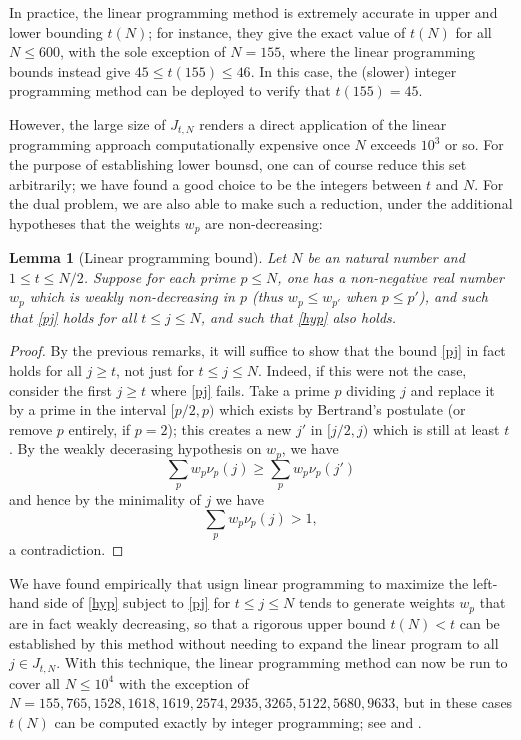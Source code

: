 \documentclass[12pt,a4paper,reqno]{amsart}
\numberwithin{equation}{section}
\theoremstyle{plain}
\newtheorem{lemma}[theorem]{Lemma}
\theoremstyle{definition}
\begin{document}
In practice, the linear programming method is extremely accurate in upper and lower bounding $t(N)$; for instance, they give the exact value of $t(N)$ for all $N \leq 600$, with the sole exception of $N=155$, where the linear programming bounds instead give $45 \leq t(155) \leq 46$.  In this case, the (slower) integer programming method can be deployed to verify that $t(155)=45$.


However, the large size of $J_{t,N}$ renders a direct application of the linear programming approach computationally expensive once $N$ exceeds $10^3$ or so.  For the purpose of establishing lower bounsd, one can of course reduce this set arbitrarily; we have found a good choice to be the integers between $t$ and $N$.  For the dual problem, we are also able to make such a reduction, under the additional hypotheses that the weights $w_p$ are non-decreasing:
  
\begin{lemma}[Linear programming bound]\label{lp-upper}  Let $N$ be an natural number and $1 \leq t \leq N/2$.  Suppose for each prime $p \leq N$, one has a non-negative real number $w_p$ which is weakly non-decreasing in $p$ (thus $w_p \leq w_{p'}$ when $p \leq p'$), and such that \eqref{pj} holds
  for all $t \leq j \leq N$, and such that \eqref{hyp} also holds.
\end{lemma}
  
\begin{proof}
By the previous remarks, it will suffice to show that the bound \eqref{pj} in fact holds for all $j \geq t$, not just for $t \leq j \leq N$.  Indeed, if this were not the case, consider the first $j \geq t$ where \eqref{pj} fails.  Take a prime $p$ dividing $j$ and replace it by a prime in the interval $[p/2,p)$ which exists by Bertrand's postulate (or remove $p$ entirely, if $p=2$); this creates a new $j'$ in $[j/2,j)$ which is still at least $t$.  By the weakly decerasing hypothesis on $w_p$, we have
  $$ \sum_p w_p \nu_p(j) \geq \sum_p w_p \nu_p(j')$$
  and hence by the minimality of $j$ we have
  $$ \sum_p w_p \nu_p(j) > 1, $$
  a contradiction.
\end{proof}
  
We have found empirically that usign linear programming to maximize the left-hand side of \eqref{hyp} subject to \eqref{pj} for $t \leq j \leq N$ tends to generate weights $w_p$ that are in fact weakly decreasing, so that a rigorous upper bound $t(N) < t$ can be established by this method without needing to expand the linear program to all $j \in J_{t,N}$.  With this technique, the linear programming method can now be run to cover all $N \leq 10^4$ with the exception of $N=155,765,1528,1618,1619,2574,2935,3265,5122,5680,9633$, but in these cases $t(N)$ can be computed exactly by integer programming; see \cite{github} and .
\end{document}
